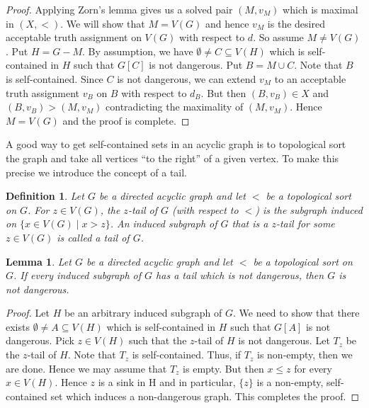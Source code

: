 \documentclass[12pt]{article}
\newtheorem{lem}[thm]{Lemma}
\newtheorem{defn}{Definition}
\theoremstyle{remark}
\begin{document}
\begin{proof}
Applying Zorn's lemma gives us a solved pair $(M, v_M)$ which is maximal in $(X, <)$.  We will show that $M = V(G)$ and hence $v_M$ is the desired acceptable truth assignment on $V(G)$ with respect to $d$.  So assume $M \neq V(G)$.  Put $H = G - M$.  By assumption, we have $\emptyset \neq C \subseteq V(H)$ which is self-contained in $H$ such that $G[C]$ is not dangerous.  Put $B = M \cup C$.  Note that $B$ is self-contained.  Since $C$ is not dangerous, we can extend $v_M$ to an acceptable truth assignment $v_B$ on $B$ with respect to $d_B$.  But then $(B, v_B) \in X$ and $(B, v_B) > (M, v_M)$ contradicting the maximality of $(M, v_M)$. Hence $M = V(G)$ and the proof is complete.
\end{proof}


A good way to get self-contained sets in an acyclic graph is to topological sort the graph and take all vertices ``to the right'' of a given vertex.  To make this precise we introduce the concept of a tail.

\begin{defn}
Let $G$ be a directed acyclic graph and let $<$ be a topological sort on $G$.  For $z \in V(G)$, the $z$-tail of $G$ (with respect to $<$) is the subgraph induced on $\{x \in V(G) \mid x > z\}$.  An induced subgraph of $G$ that is a $z$-tail for some $z \in V(G)$ is called a \emph{tail} of $G$.
\end{defn}

\begin{lem}\label{TailLemma}
Let $G$ be a directed acyclic graph and let $<$ be a topological sort on $G$.  If every induced subgraph of $G$ has a tail which is not dangerous, then $G$ is not dangerous.
\end{lem}
\begin{proof}
Let $H$ be an arbitrary induced subgraph of $G$.  We need to show that there exists $\emptyset \neq A \subseteq V(H)$ which is self-contained in $H$ such that $G[A]$ is not dangerous.  Pick $z \in V(H)$ such that the $z$-tail of $H$ is not dangerous.  Let $T_z$ be the $z$-tail of $H$.  Note that $T_z$ is self-contained.  Thus, if $T_z$ is non-empty, then we are done.  Hence we may assume that $T_z$ is empty.  But then $x \leq z$ for every $x \in V(H)$.  Hence $z$ is a sink in H and in particular, $\{z\}$ is a non-empty, self-contained set which induces a non-dangerous graph.  This completes the proof.
\end{proof}
\end{document}

